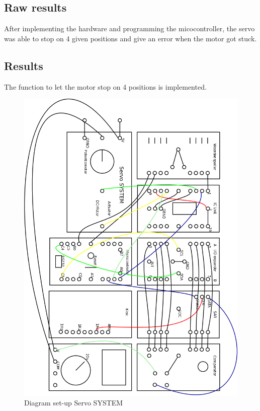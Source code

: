 \documentclass[a4paper, 12pt, titlepage]{article}
\begin{document}

\subsection{Raw results} %
After implementing the hardware and programming the micocontroller, the servo was able to stop on 4 given positions and give an error when the motor got stuck.

\subsection{Results} %

The function to let the motor stop on 4 positions is implemented.

\newpage
\addtolength{\oddsidemargin}{-1in}
\addtolength{\evensidemargin}{-1in}
\begin{figure}[H]
\caption{Diagram set-up Servo SYSTEM}
\includegraphics[scale=0.45]{Servo.png}
\end{figure}
\end{document}
